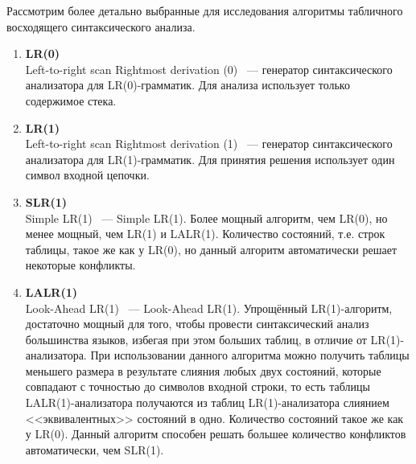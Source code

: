 \documentclass[14pt]{matmex-diploma}
\begin{document}
Рассмотрим более детально выбранные для исследования алгоритмы табличного восходящего синтаксического анализа.
\begin{enumerate}
\item
\textbf{LR(0)} \\Left-to-right scan Rightmost derivation (0) ~--- генератор синтаксического анализатора для LR(0)-грамматик. Для анализа использует только содержимое стека.
\item
\textbf{LR(1)} \\Left-to-right scan Rightmost derivation (1) ~--- генератор синтаксического анализатора для LR(1)-грамматик. Для принятия решения использует один символ входной цепочки.
\item
\textbf{SLR(1)} \\Simple LR(1) ~--- Simple LR(1). Более мощный алгоритм, чем LR(0), но менее мощный, чем LR(1) и LALR(1). Количество состояний, т.е. строк таблицы, такое же как у LR(0), но данный алгоритм автоматически решает некоторые конфликты.
\item
\textbf{LALR(1)} \\Look-Ahead LR(1) ~--- Look-Ahead LR(1). Упрощённый LR(1)-алгоритм, достаточно мощный для того, чтобы провести синтаксический анализ большинства языков, избегая при этом больших таблиц, в отличие от LR(1)-анализатора. При использовании данного алгоритма можно получить таблицы меньшего размера в результате слияния любых двух состояний, которые совпадают с точностью до символов входной строки, то есть таблицы LALR(1)-анализатора получаются из таблиц LR(1)-анализатора слиянием <<эквивалентных>> состояний в одно. Количество состояний такое же как у LR(0). Данный алгоритм способен решать большее количество конфликтов автоматически, чем SLR(1).
\end{enumerate}
\end{document}
